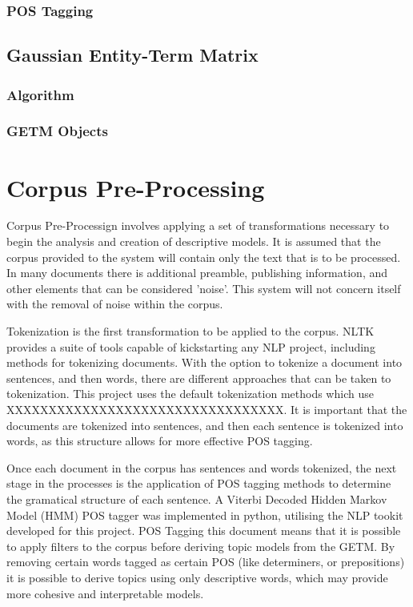 \documentclass[10pt]{report}
\begin{document}
\subsubsection{POS Tagging}


\subsection{Gaussian Entity-Term Matrix}

\subsubsection{Algorithm}

\subsubsection{GETM Objects}




\section{Corpus Pre-Processing}

Corpus Pre-Processign involves applying a set of transformations necessary to begin the analysis and creation of descriptive models. It is assumed that the corpus provided to the system will contain only the text that is to be processed. In many documents there is additional preamble, publishing information, and other elements that can be considered 'noise'. This system will not concern itself with the removal of noise within the corpus.

Tokenization is the first transformation to be applied to the corpus. NLTK provides a suite of tools capable of kickstarting any NLP project, including methods for tokenizing documents. With the option to tokenize a document into sentences, and then words, there are different approaches that can be taken to tokenization. This project uses the default tokenization methods which use XXXXXXXXXXXXXXXXXXXXXXXXXXXXXXXXX. It is important that the documents are tokenized into sentences, and then each sentence is tokenized into words, as this structure allows for more effective POS tagging.

Once each document in the corpus has sentences and words tokenized, the next stage in the processes is the application of POS tagging methods to determine the gramatical structure of each sentence. A Viterbi Decoded Hidden Markov Model (HMM) POS tagger was implemented in python, utilising the NLP tookit developed for this project. POS Tagging this document means that it is possible to apply filters to the corpus before deriving topic models from the GETM. By removing certain words tagged as certain POS (like determiners, or prepositions) it is possible to derive topics using only descriptive words, which may provide more cohesive and interpretable models.
\end{document}
